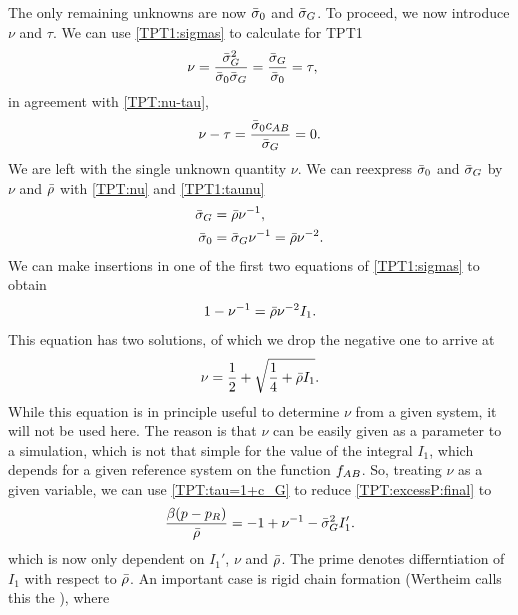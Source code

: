 \documentclass[8.5pt,twoside,twocolumn]{article}
\newcommand\fab{\enmat{f_{AB}}}
\theoremstyle{standard}
\begin{document}
The only remaining unknowns are now $\bar\sigma_0$ and $\bar\sigma_G$. To proceed, we now
introduce $\nu$ and $\tau$. We can use \eqref{TPT1:sigmas} to calculate for TPT1
\begin{equation}
\begin{aligned}
\nu&=\frac{\bar\sigma_G^2}{\bar\sigma_0\bar\sigma_G}=\frac{\bar\sigma_G}{\bar\sigma_0}=\tau,
\end{aligned}
\label{TPT1:taunu}
\end{equation}
in agreement with \eqref{TPT:nu-tau},
\begin{equation}
\nu-\tau=\frac{\bar\sigma_0 c_{AB}}{\bar\sigma_G}=0.
\end{equation}
We are left with the single unknown quantity $\nu$. We can reexpress
$\bar\sigma_0$ and $\bar\sigma_G$ by $\nu$ and $\bar\rho$ with \eqref{TPT:nu} and \eqref{TPT1:taunu}
\begin{equation}
\begin{aligned}
\bar\sigma_G&=\bar\rho\nu^{-1}, \\
\bar\sigma_0&=\bar\sigma_G\nu^{-1}=\bar\rho\nu^{-2}.
\end{aligned}
\end{equation}
We can make insertions in one of the first two equations of \eqref{TPT1:sigmas}
to obtain
\begin{equation}
1-\nu^{-1}=\bar\rho\nu^{-2}I_1.
\end{equation}
This equation has two solutions, of which we drop the negative one to arrive at
\begin{equation}
\nu=\frac 1 2 + \sqrt{\frac 1 4 + \bar\rho I_1}.
\end{equation}
While this equation is in principle useful to determine $\nu$ from a given system,
it will not be used here. The reason is that $\nu$ can be easily given as a parameter
to a simulation, which is not that simple for the value of the integral $I_1$,
which depends for a given reference system on the function $\fab$. So, treating
$\nu$ as a given variable, we can use \eqref{TPT:tau=1+c_G} to reduce \eqref{TPT:excessP:final}
to
\begin{equation}
\begin{aligned}
\frac{\beta(p-p_R)}{\bar\rho}=-1+\nu^{-1}-\bar\sigma_G^2I_1'.
\end{aligned}
\end{equation}
which is now only dependent on $I_1'$, $\nu$ and $\bar\rho$. The prime denotes
differntiation of $I_1$ with respect to $\bar\rho$. An important case is
rigid chain formation (Wertheim calls this the ), where
\end{document}
